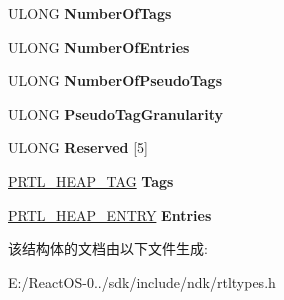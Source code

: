 \begin{DoxyCompactItemize}
U\+L\+O\+NG {\bfseries Number\+Of\+Tags}
\item 
\mbox{\label{struct___r_t_l___h_e_a_p___i_n_f_o_r_m_a_t_i_o_n_ad11b9e0e8f1add238f778936370c1bc2}} 
U\+L\+O\+NG {\bfseries Number\+Of\+Entries}
\item 
\mbox{\label{struct___r_t_l___h_e_a_p___i_n_f_o_r_m_a_t_i_o_n_a5f634171c789d1991fe6c0105dcc7946}} 
U\+L\+O\+NG {\bfseries Number\+Of\+Pseudo\+Tags}
\item 
\mbox{\label{struct___r_t_l___h_e_a_p___i_n_f_o_r_m_a_t_i_o_n_a31c3f4cb26913d59f5deca713517be9d}} 
U\+L\+O\+NG {\bfseries Pseudo\+Tag\+Granularity}
\item 
\mbox{\label{struct___r_t_l___h_e_a_p___i_n_f_o_r_m_a_t_i_o_n_a6475feafe973afb6a78d132f59d9518b}} 
U\+L\+O\+NG {\bfseries Reserved} \mbox{[}5\mbox{]}
\item 
\mbox{\label{struct___r_t_l___h_e_a_p___i_n_f_o_r_m_a_t_i_o_n_a69340afc977c3b04963e48b676eed3e0}} 
\hyperlink{struct___r_t_l___h_e_a_p___t_a_g}{P\+R\+T\+L\+\_\+\+H\+E\+A\+P\+\_\+\+T\+AG} {\bfseries Tags}
\item 
\mbox{\label{struct___r_t_l___h_e_a_p___i_n_f_o_r_m_a_t_i_o_n_acaf53ca501c62a91d50410f916d33e48}} 
\hyperlink{struct___r_t_l___h_e_a_p___e_n_t_r_y}{P\+R\+T\+L\+\_\+\+H\+E\+A\+P\+\_\+\+E\+N\+T\+RY} {\bfseries Entries}
\end{DoxyCompactItemize}


该结构体的文档由以下文件生成\+:\begin{DoxyCompactItemize}
\item 
E\+:/\+React\+O\+S-\/0../sdk/include/ndk/rtltypes.\+h\end{DoxyCompactItemize}
